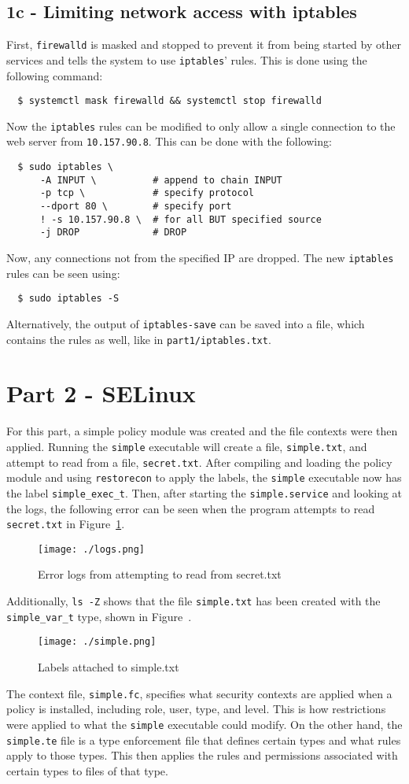 \documentclass[11pt]{article}
\begin{document}
\subsection*{1c - Limiting network access with iptables}
First, \verb|firewalld| is masked and stopped to prevent it from being started by other services and tells the system to use
\verb|iptables|' rules. This is done using the following command:
\begin{verbatim}
  $ systemctl mask firewalld && systemctl stop firewalld
\end{verbatim}
Now the \verb|iptables| rules can be modified to only allow a single connection to the web server from \verb|10.157.90.8|.
This can be done with the following:
\begin{verbatim}
  $ sudo iptables \
      -A INPUT \          # append to chain INPUT
      -p tcp \            # specify protocol
      --dport 80 \        # specify port
      ! -s 10.157.90.8 \  # for all BUT specified source
      -j DROP             # DROP
\end{verbatim}
Now, any connections not from the specified IP are dropped. The new \verb|iptables| rules can be seen using:
\begin{verbatim}
  $ sudo iptables -S
\end{verbatim}
Alternatively, the output of \verb|iptables-save| can be saved into a file, which contains the rules as well, like in
\verb|part1/iptables.txt|.
\section*{Part 2 - SELinux}
For this part, a simple policy module was created and the file contexts were then applied. Running the \verb|simple|
executable will create a file, \verb|simple.txt|, and attempt to read from a file, \verb|secret.txt|. After
compiling and loading the policy module and using \verb|restorecon| to apply the labels, the \verb|simple|
executable now has the label \verb|simple_exec_t|. Then, after starting the \verb|simple.service| and looking
at the logs, the following error can be seen when the program attempts to read \verb|secret.txt| in Figure~\ref{fig:logs}.
\begin{figure}[htbp]
  \centering
  \texttt{[image: ./logs.png]}
  \caption{\label{fig:logs}
  Error logs from attempting to read from secret.txt}
\end{figure}
Additionally, \verb|ls -Z| shows that the file \verb|simple.txt| has been created with the \verb|simple_var_t|
type, shown in Figure~\label{fig:simple}.
\begin{figure}[htbp]
  \centering
  \texttt{[image: ./simple.png]}
  \caption{\label{fig:simple}
  Labels attached to simple.txt}
\end{figure}
The context file, \verb|simple.fc|, specifies what security contexts are applied when a policy is installed,
including role, user, type, and level. This is how restrictions were applied to what the \verb|simple|
executable could modify. On the other hand, the \verb|simple.te| file is a type enforcement file that defines
certain types and what rules apply to those types. This then applies the rules and permissions associated with
certain types to files of that type.
\end{document}
